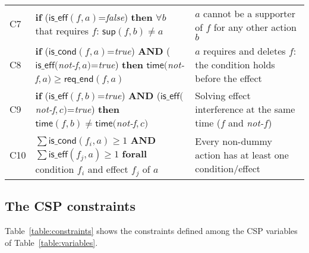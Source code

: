 \documentclass{ecai}
\newcommand{\iscond}{\mathsf{is\_cond}}    %
\newcommand{\iseff}{\mathsf{is\_eff}}    %
\newcommand{\supp}{\mathsf{sup}}   %
\newcommand{\tim}{\mathsf{time}}   %
\newcommand{\reqe}{\mathsf{req\_{end}}}   %
\begin{document}
\begin{table*}
\begin{center}
\begin{scriptsize}
\begin{tabular}{lp{10.4cm}p{6.6cm}}
C7& \textbf{if} ($\iseff(f,a)$=\textit{false}) \textbf{then} $\forall b$ that requires $f$: $\supp(f,b) \neq a$ & $a$ cannot be a supporter of $f$ for any other action $b$\\

C8& \textbf{if} ($\iscond(f,a)$=\textit{true}) \textbf{AND} ($\iseff($\textit{not-f}$,a)$=\textit{true}) \textbf{then} $\tim($\textit{not-f}$,a) \geq \reqe(f,a)$ & $a$ requires and deletes $f$: the condition holds before the effect \\ 

C9& \textbf{if} ($\iseff(f,b)$=\textit{true}) \textbf{AND} ($\iseff($\textit{not-f}$,c)$=\textit{true}) \textbf{then} $\tim(f,b) \neq \tim($\textit{not-f}$,c)$ & Solving effect interference at the same time ($f$ and \textit{not-}$f$) \\

C10& $\sum \iscond(f_i,a) \geq 1$ \textbf{AND} $\sum \iseff(f_j,a) \geq 1$ \textbf{forall} condition $f_i$ and effect $f_j$ of $a$ & Every non-dummy action has at least one condition/effect \\

\end{tabular}
\end{scriptsize}	
\label{table:constraints}
\end{center}	
\end{table*}

\subsection{The CSP constraints}
\label{section:CSPconstraints}
Table~\ref{table:constraints} shows the constraints defined among the CSP variables of Table~\ref{table:variables}. 
\end{document}
